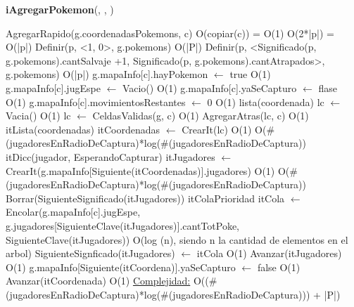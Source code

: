 \begin{Algoritmos}
\begin{algorithm}[H]{\textbf{iAgregarPokemon}(, , )}
	\begin{algorithmic}[1]
		\State AgregarRapido(g.coordenadasPokemons, c) \Comment O(copiar(c)) = O(1)
		 \Comment O(2*|p|) = O(|p|)
			\State Definir(p, <1, 0>, g.pokemons) \Comment O(|P|)
		\Else
			\State Definir(p, <Significado(p, g.pokemons).cantSalvaje +1, Significado(p, g.pokemons).cantAtrapados>, g.pokemons) \Comment O(|p|)
		\EndIf
		\State g.mapaInfo[c].hayPokemon $\gets$ true \Comment O(1)
		\State g.mapaInfo[c].jugEspe $\gets$ Vacio() \Comment O(1)
		\State g.mapaInfo[c].yaSeCapturo $\gets$ flase \Comment O(1)
 		\State g.mapaInfo[c].movimientosRestantes $\gets$ 0 \Comment O(1)
		\State lista(coordenada) lc $\gets$ Vacia() \Comment O(1)
		\State lc $\gets$ CeldasValidas(g, c) \Comment O(1)
		\State AgregarAtras(lc, c) \Comment O(1)
		\State itLista(coordenadas) itCoordenadas $\gets$ CrearIt(lc) \Comment O(1)
		 \Comment O(#(jugadoresEnRadioDeCaptura)*log(#(jugadoresEnRadioDeCaptura))
			\State itDicc(jugador, EsperandoCapturar) itJugadores $\gets$ CrearIt(g.mapaInfo[Siguiente(itCoordenadas)].jugadores) \Comment O(1)
			 \Comment O(#(jugadoresEnRadioDeCaptura)*log(#(jugadoresEnRadioDeCaptura))
					\State Borrar(SiguienteSignificado(itJugadores))				
				\EndIf
				\State itColaPrioridad itCola $\gets$ Encolar(g.mapaInfo[c].jugEspe, g.jugadores[SiguienteClave(itJugadores)].cantTotPoke, SiguienteClave(itJugadores)) \Comment O(log (n), siendo n la cantidad de elementos en el arbol)
				\State SiguienteSignficado(itJugadores) $\gets$ itCola \Comment O(1)
				\State Avanzar(itJugadores) \Comment O(1)
			\EndWhile
				\State g.mapaInfo[Siguiente(itCoordena)].yaSeCapturo $\gets$ false \Comment O(1)			
			\EndIf
			\State Avanzar(itCoordenada) \Comment O(1)
		\EndWhile
		\medskip
		\Statex \underline{Complejidad:} O((#(jugadoresEnRadioDeCaptura)*log(#(jugadoresEnRadioDeCaptura))) + |P|)

\end{algorithmic}
\end{algorithm}
\end{Algoritmos}
